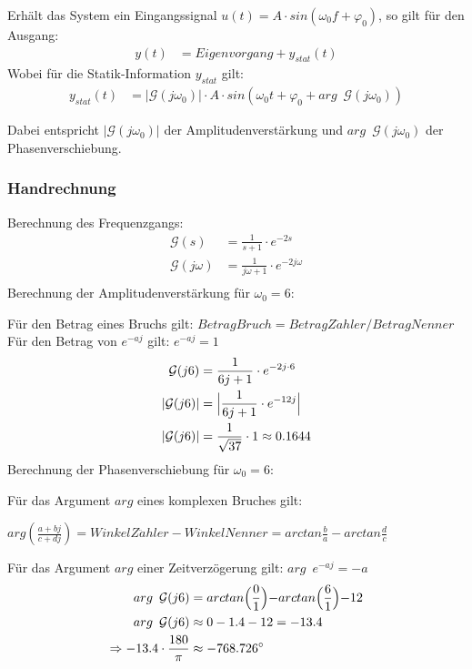 Erhält das System ein Eingangssignal $u(t) = A \cdot sin(\omega_0 f + \varphi_0)$, so gilt für den Ausgang:
\begin{align*} 
    y(t) &= Eigenvorgang + y_{stat}(t)
\end{align*}
Wobei für die Statik-Information $y_{stat}$ gilt:
\begin{align*}
    y_{stat}(t) &= |\mathcal{G}(j\omega_0)| \cdot A \cdot sin(\omega_0 t+\varphi_0 + arg \enspace \mathcal{G}(j\omega_0))
\end{align*}

Dabei entspricht $|\mathcal{G}(j\omega_0)|$ der Amplitudenverstärkung und $arg \enspace \mathcal{G}(j\omega_0)$ der Phasenverschiebung.

\subsubsection{Handrechnung}
Berechnung des Frequenzgangs:
\begin{align*} 
    \mathcal{G}(s) &=  \frac{1}{s+1}\cdot e^{-2s} \\
    \mathcal{G}(j\omega) &=  \frac{1}{j\omega+1} \cdot e^{-2j\omega} \\
\end{align*} 
Berechnung der Amplitudenverstärkung für $ \omega_0 = 6$: 

Für den Betrag eines Bruchs gilt: $BetragBruch = BetragZ\ddot ahler / BetragNenner$ \\
Für den Betrag von $e^{-aj}$ gilt: $e^{-aj} = 1$
\begin{align*} 
    \mathcal{G}(j6) &=  \frac{1}{6j+1} \cdot e^{-2j\cdot 6}\\
    |\mathcal{G}(j6)| &=  \Bigl| \frac{1}{6j+1} \cdot e^{-12j}\Bigr| \\
    |\mathcal{G}(j6)| &=  \frac{1}{\sqrt{37}}\cdot 1 \approx 0.1644 \\
\end{align*} 
Berechnung der Phasenverschiebung für $ \omega_0 = 6$: 

Für das Argument $arg$ eines komplexen Bruches gilt: 

\quad \quad $arg(\frac{a + bj}{c + dj}) = WinkelZ\ddot ahler - WinkelNenner = arctan\frac{b}{a} - arctan\frac{d}{c}$

Für das Argument $arg$ einer Zeitverzögerung gilt: $arg \enspace e^{-aj} = -a$
\begin{align*} 
    arg \enspace \mathcal{G}(j6) &=   arctan \Bigl( \frac{0}{1} \Bigl) - arctan \Bigl( \frac{6}{1} \Bigl) -12  \\
    arg \enspace \mathcal{G}(j6) &\approx  0-1.4-12 = -13.4 \\
             \Rightarrow  -13.4 \cdot \frac{180}{\pi} & \approx -768.726^{\circ}
\end{align*} 

